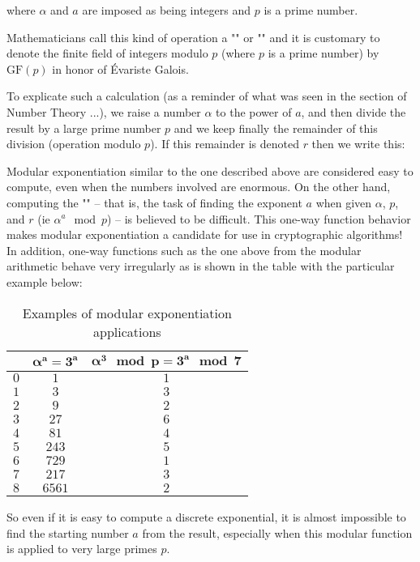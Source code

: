 	where $\alpha$ and $a$ are imposed as being integers and $p$ is a prime number.
	
	Mathematicians call this kind of operation a "" or "" and it is customary to denote the finite field of integers modulo $p$ (where $p$ is a prime number) by $\text{GF}(p)$ in honor of Évariste Galois.
	
	To explicate such a calculation (as a reminder of what was seen in the section of Number Theory ...), we raise a number $\alpha$ to the power of $a$, and then divide the result by a large prime number $p$ and we keep finally the remainder of this division (operation modulo $p$). If this remainder is denoted $r$ then we write this:
	
	Modular exponentiation similar to the one described above are considered easy to compute, even when the numbers involved are enormous. On the other hand, computing the "" – that is, the task of finding the exponent $a$ when given $\alpha$, $p$, and $r$ (ie $\alpha^a \mod p$) – is believed to be difficult. This one-way function behavior makes modular exponentiation a candidate for use in cryptographic algorithms! In addition, one-way functions such as the one above from the modular arithmetic behave very irregularly as is shown in the table with the particular example below:
	\begin{table}[H]
		\centering
		\begin{tabular}{|c|c|c|}
		\hline
		\rowcolor[HTML]{9B9B9B} 
		\multicolumn{1}{|l|}{\cellcolor[HTML]{9B9B9B}$\pmb{a}$} & \multicolumn{1}{l|}{\cellcolor[HTML]{9B9B9B}$\pmb{\alpha^a=3^a}$} & \multicolumn{1}{l|}{\cellcolor[HTML]{9B9B9B}$\pmb{\alpha^3 \mod p=3^a \mod 7}$} \\ \hline
		$0$ & $1$ & $1$ \\ \hline
		$1$ & $3$ & $3$ \\ \hline
		$2$ & $9$ & $2$ \\ \hline
		$3$ & $27$ & $6$ \\ \hline
		$4$ & $81$ & $4$ \\ \hline
		$5$ & $243$ & $5$ \\ \hline
		$6$ & $729$ & $1$ \\ \hline
		$7$ & $217$ & $3$ \\ \hline
		$8$ & $6561$ & $2$ \\ \hline
		\end{tabular}
		\caption{Examples of modular exponentiation applications}
	\end{table}
	So even if it is easy to compute a discrete exponential, it is almost impossible to find the starting number $a$ from the result, especially when this modular function is applied to very large primes $p$.

